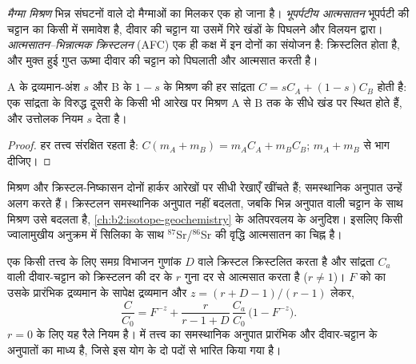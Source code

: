 \begin{definition}[मैग्मा मिश्रण; भूपर्पटीय आत्मसातन; AFC]
\label{def:b2:magmatic-differentiation:open}
\emph{मैग्मा मिश्रण} भिन्न संघटनों वाले
दो मैग्माओं का मिलकर एक हो जाना है।
\emph{भूपर्पटीय आत्मसातन} भूपर्पटी की चट्टान का किसी  में समावेश है,
दीवार की चट्टान या उसमें गिरे खंडों के पिघलने और विलयन द्वारा।
\emph{आत्मसातन--भिन्नात्मक क्रिस्टलन} (AFC)
एक ही कक्ष में इन दोनों का संयोजन है:  क्रिस्टलित होता है, और मुक्त हुई
गुप्त ऊष्मा दीवार की चट्टान को पिघलाती और आत्मसात करती है।
\end{definition}

\begin{proposition}[मिश्रण सांद्रताओं में रैखिक है]\label{prop:b2:magmatic-differentiation:mixing}
 A के द्रव्यमान-अंश $s$ और  B के $1-s$ के मिश्रण की हर
सांद्रता $C = sC_A + (1-s)C_B$ होती है: एक सांद्रता के विरुद्ध दूसरी के किसी भी आरेख पर
मिश्रण A से B तक के सीधे खंड पर स्थित होते हैं, और उत्तोलक नियम
$s$ देता है।
\end{proposition}

\begin{proof}
हर तत्त्व संरक्षित रहता है: $C(m_A + m_B) = m_AC_A + m_BC_B$; $m_A + m_B$ से भाग दीजिए।
\end{proof}

मिश्रण और क्रिस्टल-निष्कासन दोनों हार्कर आरेखों पर सीधी रेखाएँ खींचते हैं; समस्थानिक
अनुपात उन्हें अलग करते हैं। क्रिस्टलन समस्थानिक अनुपात नहीं बदलता, जबकि
भिन्न अनुपात वाली चट्टान के साथ मिश्रण उसे बदलता है, \cref{ch:b2:isotope-geochemistry}
के अतिपरवलय के अनुदिश। इसलिए किसी ज्वालामुखीय अनुक्रम में सिलिका के साथ $^{87}$Sr/$^{86}$Sr की वृद्धि
आत्मसातन का चिह्न है।

\begin{proposition}[भिन्नात्मक क्रिस्टलन के साथ आत्मसातन]
\label{prop:b2:magmatic-differentiation:afc}
एक  किसी तत्त्व के लिए समग्र विभाजन गुणांक $D$ वाले क्रिस्टल क्रिस्टलित करता है
और सांद्रता $C_a$ वाली दीवार-चट्टान को क्रिस्टलन की दर के $r$ गुना दर से
आत्मसात करता है ($r \ne 1$)। $F$ को  का उसके प्रारंभिक द्रव्यमान के सापेक्ष द्रव्यमान
और $z = (r + D - 1)/(r - 1)$ लेकर,
\[
\frac{C}{C_0} = F^{-z} + \frac{r}{r - 1 + D}\,\frac{C_a}{C_0}\,\bigl(1 - F^{-z}\bigr).
\]
$r = 0$ के लिए यह रैले नियम है।  में तत्त्व का समस्थानिक अनुपात
प्रारंभिक  और दीवार-चट्टान के अनुपातों का माध्य है, जिसे
इस योग के दो पदों से भारित किया गया है।
\end{proposition}


